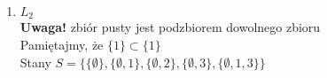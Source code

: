 \begin{enumerate}[label=\alph*)]
\begin{enumerate}
\begin{align*}
\begin{matrix}
\frac{1}{6} \pi _1&=\frac{1}{6} \pi _3\\
\frac{1}{6} \pi _1+\frac{1}{6} \pi _5 &=\frac{1}{3} \pi _4\\
\frac{1}{6} \pi _2+\frac{1}{6} \pi _4 &= \frac{1}{3}\pi _5
\end{matrix}\right. \Leftrightarrow \\
&\Leftrightarrow \left\{\begin{matrix}
\pi _1 &= \pi _2\\
\pi _1 &= \pi _3\\
\pi _1 &= \pi _4 \\
\pi _1 &= \pi _5 
\end{matrix}\right.\\
&\pi _1+\pi _2+\pi _3+\pi _4+\pi _5=1\Leftrightarrow 5\pi _1 = 1 \Leftrightarrow \pi _1 = \frac{1}{5}\\
&\bar{\pi}=\left[\frac{1}{5},\frac{1}{5},\frac{1}{5},\frac{1}{5},\frac{1}{5}\right]
\end{align*}

\item $L_2$\\
\textbf{Uwaga!} zbiór pusty jest podzbiorem dowolnego zbioru\\
Pamiętajmy, że $\{1\} \subset \{1\}$\\
Stany $S=\{\{\emptyset\},\{\emptyset,1\},\{\emptyset,2\},\{\emptyset,3\},\{\emptyset,1,3\} \}$


\end{enumerate}
\end{enumerate}
